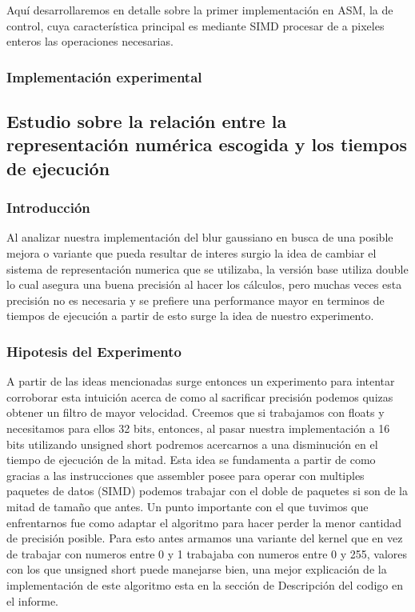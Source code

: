 Aquí desarrollaremos en detalle sobre la primer implementación en ASM, la de
control, cuya característica principal es mediante SIMD procesar de a pixeles
enteros las operaciones necesarias.

\subsubsection{Implementación experimental}

\subsection{Estudio sobre la relación entre la representación numérica escogida y los tiempos de ejecución}

\subsubsection{Introducción}

Al analizar nuestra implementación del blur gaussiano en busca de una posible mejora o variante que pueda resultar de interes surgio la idea de cambiar el sistema de representación numerica que se utilizaba, la versión base utiliza double lo cual asegura una buena precisión al hacer los cálculos, pero muchas veces esta precisión no es necesaria y se prefiere una performance mayor en terminos de tiempos de ejecución a partir de esto surge la idea de nuestro experimento.

\subsubsection{Hipotesis del Experimento}

A partir de las ideas mencionadas surge entonces un experimento para intentar corroborar esta intuición acerca de como al sacrificar precisión podemos quizas obtener un filtro de mayor velocidad. Creemos que si trabajamos con floats y necesitamos para ellos 32 bits, entonces, al pasar nuestra implementación a 16 bits utilizando unsigned short podremos acercarnos a una disminución en el tiempo de ejecución de la mitad. Esta idea se fundamenta a partir de como gracias a las instrucciones que assembler posee para operar con multiples paquetes de datos (SIMD) podemos trabajar con el doble de paquetes si son de la mitad de tamaño que antes. Un punto importante con el que tuvimos que enfrentarnos fue como adaptar el algoritmo para hacer perder la menor cantidad de precisión posible. Para esto antes armamos una variante del kernel que en vez de trabajar con numeros entre 0 y 1 trabajaba con numeros entre 0 y 255, valores con los que unsigned short puede manejarse bien, una mejor explicación de la implementación de este algoritmo esta en la sección de Descripción del codigo en el informe.


